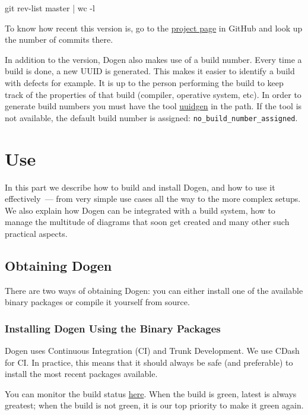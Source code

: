 \documentclass{book}
\begin{document}
\begin{pseudocode}[backgroundcolor=\color{lightgray}]
git rev-list master | wc -l
\end{pseudocode}

To know how recent this version is, go to the
\href{https://github.com/DomainDrivenConsulting/dogen}{project page}
in GitHub and look up the number of commits there.

In addition to the version, Dogen also makes use of a build
number. Every time a build is done, a new UUID is generated. This
makes it easier to identify a build with defects for example. It is up
to the person performing the build to keep track of the properties of
that build (compiler, operative system, etc). In order to generate
build numbers you must have the tool
\href{http://www.linuxcommand.org/man_pages/uuidgen1.html}{uuidgen} in
the path. If the tool is not available, the default build number is
assigned: \texttt{no\_build\_number\_assigned}.

\part{Use}

In this part we describe how to build and install Dogen, and how to
use it effectively~--- from very simple use cases all the way to the
more complex setups. We also explain how Dogen can be integrated with
a build system, how to manage the multitude of diagrams that soon get
created and many other such practical aspects.

\chapter{Obtaining Dogen}

There are two ways of obtaining Dogen: you can either install one of
the available binary packages or compile it yourself from source.

\section{Installing Dogen Using the Binary Packages}

Dogen uses Continuous Integration (CI) and Trunk Development. We use
CDash for CI. In practice, this means that it should always be safe
(and preferable) to install the most recent packages available.

You can monitor the build status
\href{http://my.cdash.org/index.php?project\%3DDogen}{here}. When the
build is green, latest is always greatest; when the build is not
green, it is our top priority to make it green again.
\end{document}
